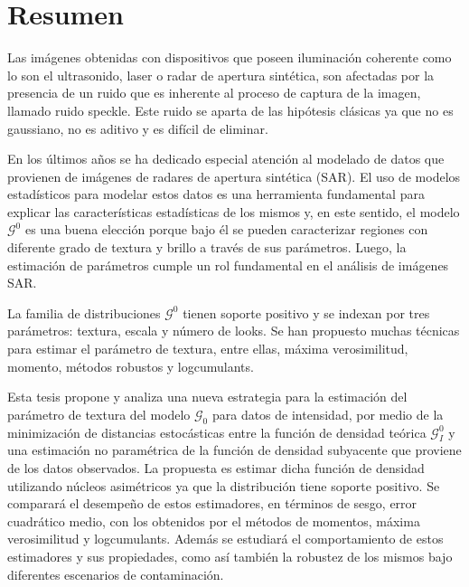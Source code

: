 
\chapter{Resumen}

Las imágenes obtenidas con dispositivos que poseen iluminación coherente como lo son el ultrasonido, laser o radar de apertura sintética, son afectadas por la presencia de un ruido que es inherente al proceso de captura de la imagen, llamado ruido speckle. Este ruido se aparta de las hipótesis clásicas ya que no es gaussiano, no es aditivo y es difícil de eliminar. 

En los últimos años se ha dedicado especial atención al modelado de datos que provienen de imágenes de radares de apertura sintética (SAR). El uso de modelos estadísticos para modelar estos datos es una herramienta fundamental para explicar las características estadísticas de los mismos y, en este sentido, el modelo $\mathcal{G}^0$ es una buena elección porque bajo él se pueden caracterizar regiones con diferente grado de textura y brillo a través de sus parámetros. Luego, la estimación de parámetros cumple un rol fundamental en el análisis de imágenes SAR.  

La familia de distribuciones $\mathcal{G}^0$  tienen soporte positivo y se indexan por tres parámetros: textura, escala y número de looks. %
Se han propuesto muchas técnicas para estimar el parámetro de textura, entre ellas, máxima verosimilitud, momento, métodos robustos y logcumulants.

Esta tesis propone y analiza una nueva estrategia para la estimación del parámetro de textura del modelo $\mathcal G_0$ para datos de intensidad, por medio de la minimización de distancias estocásticas entre la función de densidad teórica $\mathcal{G}_I^0$ y una estimación no paramétrica de la función de densidad subyacente que proviene de los datos observados. La propuesta es estimar dicha función de densidad utilizando núcleos asimétricos ya que la distribución tiene soporte positivo. Se comparará el desempeño de estos estimadores, en términos de sesgo, error cuadrático medio, con los obtenidos por el métodos de momentos, máxima verosimilitud y logcumulants. Además se estudiará el comportamiento de estos estimadores y sus propiedades, como así también la robustez de los mismos bajo diferentes escenarios de contaminación.